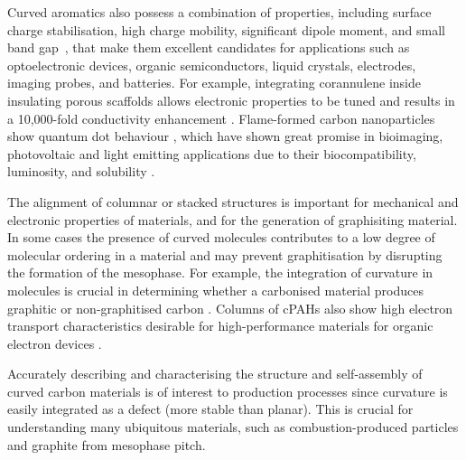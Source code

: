 Curved aromatics also possess a combination of properties, including surface charge stabilisation, high charge mobility, significant dipole moment, and small band gap~\cite{Menon2019optical}, that make them excellent candidates for applications such as optoelectronic devices, organic semiconductors, liquid crystals, electrodes, imaging probes, and batteries. For example, integrating corannulene inside insulating porous scaffolds allows electronic properties to be tuned and results in a 10,000-fold conductivity enhancement \cite{rice2018stack}. Flame-formed carbon nanoparticles show quantum dot behaviour \cite{liu2019flame}, which have shown great promise in bioimaging, photovoltaic and light emitting applications due to their biocompatibility, luminosity, and solubility \cite{zhang2012graphene}.

The alignment of columnar or stacked structures is important for mechanical and electronic properties of materials, and for the generation of graphisiting material. In some cases the presence of curved molecules contributes to a low degree of molecular ordering in a material %
\cite{zhong2018structural} and may prevent graphitisation by disrupting the formation of the mesophase. For example, the integration of curvature in molecules is crucial in determining whether a carbonised material produces graphitic or non-graphitised carbon \cite{abrahamson2018carbon}. Columns of cPAHs also show high electron transport characteristics desirable for high-performance materials for organic electron devices \cite{wang2015electronic}.

Accurately describing and characterising the structure and self-assembly of curved carbon materials is of interest to production processes since curvature is easily integrated as a defect (more stable than planar). This is crucial for understanding many ubiquitous materials, such as combustion-produced particles and graphite from mesophase pitch.
%

